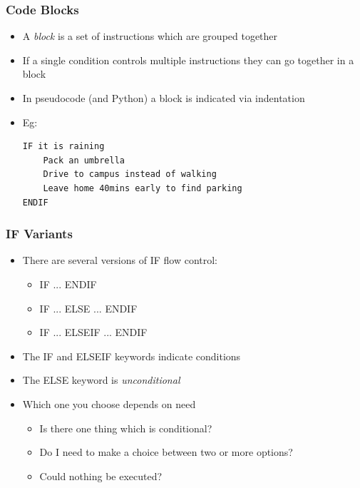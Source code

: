 \documentclass[14pt]{beamer}
\begin{document}
\begin{frame}[fragile]
\frametitle{Code Blocks}
\begin{itemize}
\item A \textit{block} is a set of instructions which are grouped together
\item If a single condition controls multiple instructions they can go together in a block
\item In pseudocode (and Python) a block is indicated via indentation
\item Eg:
\begin{lstlisting}[style=pseudo]
IF it is raining
	Pack an umbrella
	Drive to campus instead of walking
	Leave home 40mins early to find parking
ENDIF
\end{lstlisting}
\end{itemize}
\end{frame}

\begin{frame}
\frametitle{IF Variants}
\begin{itemize}
\item There are several versions of IF flow control:
	\begin{itemize}
		\item IF ... ENDIF
		\item IF ... ELSE ... ENDIF
		\item IF ... ELSEIF ... ENDIF
	\end{itemize}
\item The IF and ELSEIF keywords indicate conditions
\item The ELSE keyword is \textit{unconditional}
\item Which one you choose depends on need
	\begin{itemize}
		\item Is there one thing which is conditional?
		\item Do I need to make a choice between two or more options?
		\item Could nothing be executed?
	\end{itemize}
\end{itemize}
\end{frame}
\end{document}

